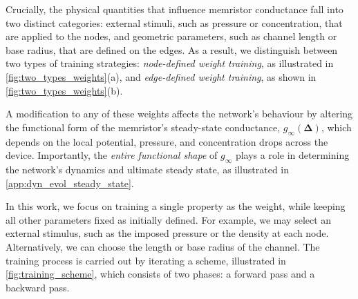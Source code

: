 \documentclass[reprint,superscriptaddress,prb,showkeys]{revtex4-2}
\begin{document}
Crucially, the physical quantities that influence memristor conductance fall into two distinct categories: external stimuli, such as pressure or concentration, that are applied to the nodes, and geometric parameters, such as channel length or base radius, that are defined on the edges. As a result, we distinguish between two types of training strategies: \emph{node-defined weight training}, as illustrated in \cref{fig:two_types_weights}(a), and \emph{edge-defined weight training}, as shown in \cref{fig:two_types_weights}(b).

A modification to any of these weights affects the network's behaviour by altering the functional form of the memristor’s steady-state conductance, $g_{\infty}(\boldsymbol{\Delta})$, which depends on the local potential, pressure, and concentration drops across the device. Importantly, the \emph{entire functional shape} of $g_{\infty}$ plays a role in determining the network’s dynamics and ultimate steady state, as illustrated in \cref{app:dyn_evol_steady_state}.

In this work, we focus on training a single property as the weight, while keeping all other parameters fixed as initially defined. For example, we may select an external stimulus, such as the imposed pressure or the density at each node. Alternatively, we can choose the length or base radius of the channel. The training process is carried out by iterating a scheme, illustrated in \cref{fig:training_scheme}, which consists of two phases: a forward pass and a backward pass.
\end{document}
